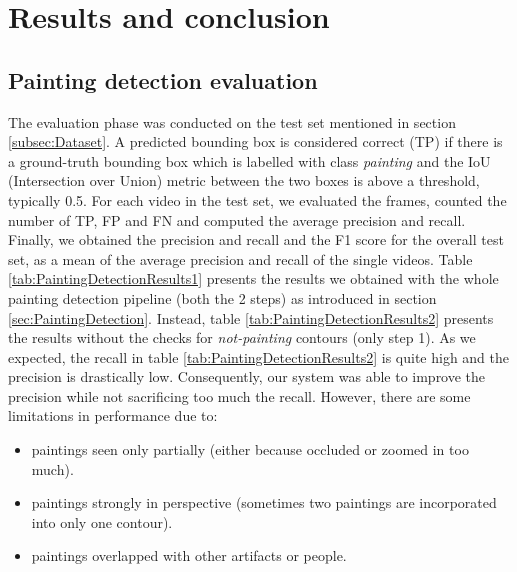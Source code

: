 \documentclass[10pt,twocolumn,letterpaper]{article}
\begin{document}
\section{Results and conclusion}
\subsection{Painting detection evaluation}
\label{subsec:PaintingDetectionEvaluation}

The evaluation phase was conducted on the test set mentioned in section \ref{subsec:Dataset}.
A predicted bounding box is considered correct (TP) if there is a ground-truth bounding box which is labelled with class \textit{painting} and the IoU (Intersection over Union) metric between the two boxes is above a threshold, typically 0.5.
For each video in the test set, we evaluated the frames, counted the number of TP, FP and FN and computed the average precision and recall. Finally, we obtained the precision and recall and the F1 score for the overall test set, as a mean of the average precision and recall of the single videos.
Table \ref{tab:PaintingDetectionResults1} presents the results we obtained with the whole painting detection pipeline (both the 2 steps) as introduced in section \ref{sec:PaintingDetection}. Instead, table \ref{tab:PaintingDetectionResults2} presents the results without the checks for \textit{not-painting} contours (only step 1). As we expected, the recall in table \ref{tab:PaintingDetectionResults2} is quite high and the precision is drastically low. Consequently, our system was able to improve the precision while not sacrificing too much the recall. 
However, there are some limitations in performance due to:
\begin{itemize}
    \item paintings seen only partially (either because occluded or zoomed in too much).
    \item paintings strongly in perspective (sometimes two paintings are incorporated into only one contour).
    \item paintings overlapped with other artifacts or people.
\end{itemize}
\end{document}
